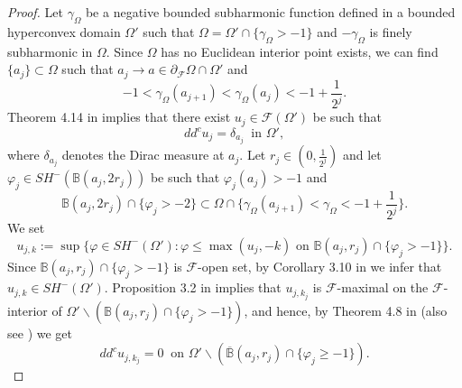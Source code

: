 \documentclass[3p,times]{elsarticle}
\numberwithin{equation}{section}
\newtheorem{The main theorem}[theorem]{The main theorem}
\theoremstyle{definition}
\begin{document}
\begin{proof}
Let  $\gamma_\Omega$ be  a negative bounded subharmonic function defined in a bounded hyperconvex domain $\Omega'$ such that  $\Omega =\Omega' \cap \{\gamma_\Omega >-1\}$ and  $-\gamma_\Omega $ is   finely subharmonic  in $\Omega$.
Since $\Omega$ has no Euclidean interior point exists, we can find $\{a_j \}  \subset \Omega$ such that $a_j\to a \in \partial _{\mathcal F} \Omega \cap \Omega'$ and  
$$ -1< \gamma_\Omega (a_{j+1}) < \gamma_\Omega (a_j) < -1+ \frac{1}{2^{j} }.$$  
Theorem 4.14 in \cite{ACCH} implies that there exist $u_j \in \mathcal F(\Omega')$ be such that 
$$
dd^c u_j   = \delta _{a_j} \ \text{ in  } \Omega',
$$
where  $\delta_{a_j}$ denotes  the Dirac measure at $a_j$.  
Let $r_j\in (0, \frac{1}{2^j})$ and let $\varphi_j \in SH^-(\mathbb B(a_j, 2 r_j))$ be such that $\varphi_j (a_j) >-1$ and 
$$ \mathbb B(a_j, 2r_j ) \cap \{\varphi_j >-2\} \subset  \Omega \cap \{\gamma_\Omega (a_{j+1}) < \gamma_\Omega < -1+ \frac{1}{2^{j} } \}.$$ 
We set 
$$
u_{j,k}:= \sup \{ \varphi \in SH^-(\Omega') : \varphi \leq \max( u_j ,-k)  \text{ on  }  \mathbb B(a_j,r_j) \cap \{\varphi_j >-1\}  \} .
$$
Since $\mathbb B(a_j,r_j) \cap \{\varphi_j>-1\}$ is $\mathcal F$-open set, by Corollary 3.10 in \cite{KFW11} we infer that 
$u_{j,k} \in  SH^-(\Omega')$.
Proposition 3.2 in \cite{KS14} implies that   $u_{j, k_j}$ is $\mathcal F$-maximal on the $\mathcal F$-interior   of $\Omega' \backslash ( \mathbb B(a_j,r_j) \cap \{\varphi_j >-1\} )$, and hence,   
by Theorem 4.8 in \cite{KS14} (also see \cite{HHV17}) we get 
\begin{equation} \label{8.42.12.12}
 dd^c u_{j, k_j}   =0  \ \text{ on } \Omega' \backslash ( \overline{ \mathbb B} (a_j,r_j) \cap \{\varphi_j \geq -1\} ).
\end{equation}



\end{proof}
\end{document}
